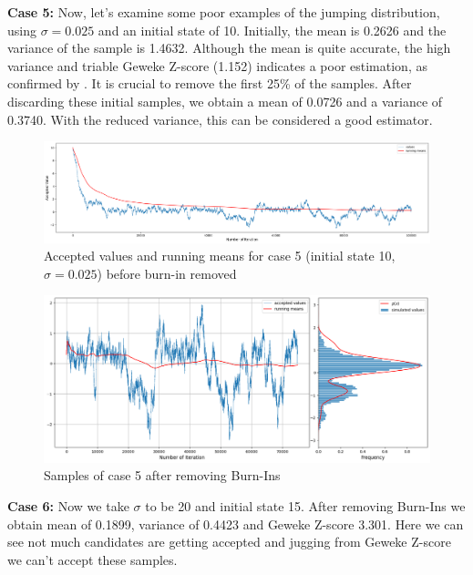 \begin{example}
	\textbf{Case 5:}  Now, let's examine some poor examples of the jumping distribution, using $\sigma = 0.025$ and an initial state of 10. Initially, the mean is 0.2626 and the variance of the sample is 1.4632. Although the mean is quite accurate, the high variance and triable Geweke Z-score (1.152) indicates a poor estimation, as confirmed by . It is crucial to remove the first 25\% of the samples. After discarding these initial samples, we obtain a mean of 0.0726 and a variance of 0.3740. With the reduced variance, this can be considered a good estimator.

	\begin{figure}[H]
		\centering
		\includegraphics[width=1\textwidth]{./images/metropolis/example1/sample-5-values.png}
		\caption{Accepted values and running means for case 5 (initial state 10, $ \sigma = 0.025 $) before burn-in removed}
		\label{fig:MH sample5}
	\end{figure}

	\begin{figure}[H]
		\centering
		\includegraphics[width=1\textwidth]{./images/metropolis/example1/sample-5-value-hist-bo.png}
		\caption{Samples of case 5 after removing Burn-Ins}
	\end{figure}

	\textbf{Case 6:} Now we take $ \sigma $ to be 20 and initial state 15. After removing Burn-Ins we obtain mean of 0.1899, variance of 0.4423 and Geweke Z-score 3.301. Here we can see not much candidates are getting accepted and jugging from Geweke Z-score we can't accept these samples.


\end{example}
